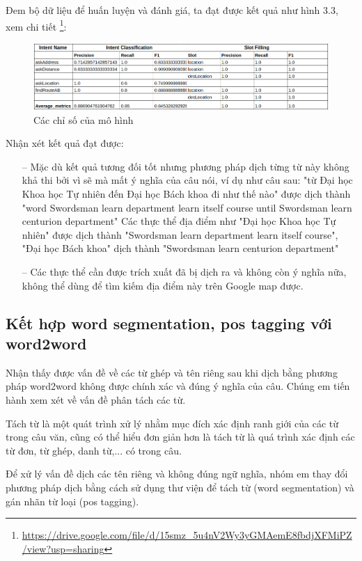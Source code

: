 Đem bộ dữ liệu để huấn luyện và đánh giá, ta đạt được kết quả như hình 3.3, xem chi tiết \footnote{\url{https://drive.google.com/file/d/15smz_5u4nV2Wy3yGMAemE8fbdjXFMiPZ/view?usp=sharing}}:

\begin{figure}[htp]
    \centering
    \includegraphics[width=15cm]{images/metrics-word2word.png}
    
    \caption{Các chỉ số của mô hình}
    \label{fig:sodohethongchiduong}
\end{figure}
Nhận xét kết quả đạt được:
\begin{itemize}
    \item[--] Mặc dù kết quả tương đối tốt nhưng phương pháp dịch từng từ này không khả thi bởi vì sẽ mà mất ý nghĩa của câu nói, ví dụ như câu sau: "từ Đại học Khoa học Tự nhiên đến Đại học Bách khoa đi như thế nào" được dịch thành "word Swordsman learn department learn itself course until Swordsman learn centurion department" Các thực thể địa điểm như "Đại học Khoa học Tự nhiên" được dịch thành "Swordsman learn department learn itself course", "Đại học Bách khoa" dịch thành "Swordsman learn centurion department"
    \item[--] Các thực thể cần được trích xuất đã bị dịch ra và không còn ý nghĩa nữa, không thể dùng để tìm kiếm địa điểm này trên Google map được.
\end{itemize}
\subsection{Kết hợp word segmentation, pos tagging với word2word}

Nhận thấy được vấn đề về các từ ghép và tên riêng sau khi dịch bằng phương pháp word2word không được chính xác và đúng ý nghĩa của câu. Chúng em tiến hành xem xét về vấn đề phân tách các từ.

Tách từ là một quát trình xử lý nhằm mục đích xác định ranh giới của các từ trong câu văn, cũng có thể hiểu đơn giản hơn là tách từ là quá trình xác định các từ đơn, từ ghép, danh từ,... có trong câu.

Để xử lý vấn đề dịch các tên riêng và không đúng ngữ nghĩa, nhóm em thay đổi phương pháp dịch bằng cách sử dụng thư viện để tách từ (word segmentation) và gán nhãn từ loại (pos tagging).

